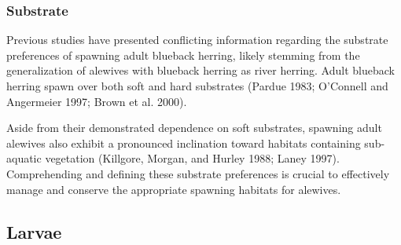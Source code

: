 \documentclass[
]{book}
\begin{document}
\hypertarget{substrate-7}{%
\subsubsection{Substrate}\label{substrate-7}}

Previous studies have presented conflicting information regarding the substrate preferences of spawning adult blueback herring, likely stemming from the generalization of alewives with blueback herring as river herring.
Adult blueback herring spawn over both soft and hard substrates (Pardue 1983; O'Connell and Angermeier 1997; Brown et al. 2000).

Aside from their demonstrated dependence on soft substrates, spawning adult alewives also exhibit a pronounced inclination toward habitats containing sub-aquatic vegetation (Killgore, Morgan, and Hurley 1988; Laney 1997).
Comprehending and defining these substrate preferences is crucial to effectively manage and conserve the appropriate spawning habitats for alewives.

\hypertarget{larvae}{%
\subsection{Larvae}\label{larvae}}
\end{document}
